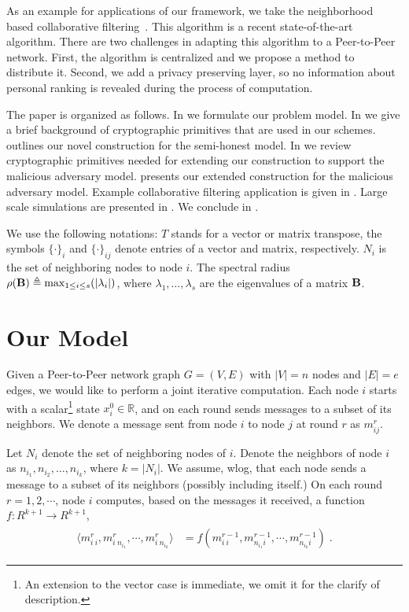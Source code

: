 \documentclass[10pt]{svjour3}
\begin{document}
As an example for applications of our framework, we take the
neighborhood based collaborative filtering~\cite{KorenCF}. This
algorithm is a recent state-of-the-art algorithm. There are two
challenges in adapting this algorithm to a Peer-to-Peer network.
First, the algorithm is centralized and we propose a method to
distribute it. Second, we add a privacy preserving layer, so no
information about personal ranking is revealed during the process
of computation.

The paper is organized as follows. In  we
formulate our problem model. In  we give a
brief background of cryptographic primitives that are used in our
schemes.  outlines our novel construction for
the semi-honest model. In  we review
cryptographic primitives needed for extending our construction to
support the malicious adversary model.
 presents our extended construction for the
malicious adversary model. Example collaborative filtering
application is given in . Large scale
simulations are presented in . We conclude in
.

We use the following notations: $T$ stands for a vector or matrix
transpose, the symbols $\{\cdot\}_{i}$ and $\{\cdot\}_{ij}$ denote
entries of a vector and matrix, respectively. $N_i$ is the set of neighboring nodes to node $i$. The spectral radius
$\rho({\bf B})\triangleq\max_{1\leq i\leq s}(|\lambda_{i}|)$, where
$\lambda_{1},\ldots, \lambda_{s}$ are the eigenvalues of a matrix
${\bf B}$.

\section{Our Model}
\label{model} Given a Peer-to-Peer network graph $G=(V, E)$ with
$|V| = n$ nodes and $|E| = e$ edges, we would like to perform a
joint iterative computation. Each node $i$ starts with a
scalar\footnote{An extension to the vector case is immediate, we
omit it for the clarify of description.} state $x_i^0 \in
\mathbb{R}$, and on each round sends messages to a subset of its
neighbors. We denote a message sent from node $i$ to node $j$ at
round $r$ as $m_{ij}^r$.

Let $N_i$ denote the set of neighboring nodes of $i$.  Denote the
neighbors of node $i$ as $n_{i_1},n_{i_2},\ldots,n_{i_k}$, where
$k=|N_i|$.  We assume, wlog, that each node sends a message to a
subset of its neighbors (possibly including itself.)  On each round $r = 1,2,\cdots$, node $i$
computes, based on the messages it received, a function $f:
R^{k+1} \rightarrow R^{k+1}$,
\small
\begin{gather*}\begin{split}\langle m_{i~i}^r, m^{r}_{i~n_{i_1}}, \cdots, m^{r}_{i~n_{i_k}}\rangle &=
f(m_{i~i}^{r-1}, m^{r-1}_{n_{i_1} i}, \cdots , m^{r-1}_{n_{i_k}
i})\;.
\end{split}\end{gather*}
\normalsize
\end{document}

